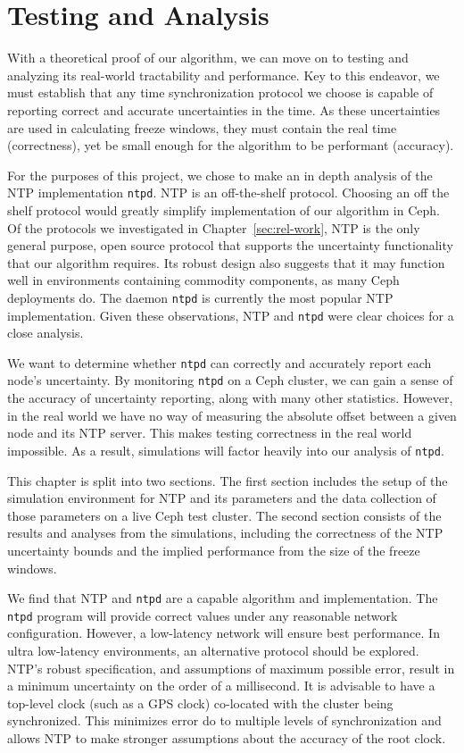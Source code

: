 \chapter{Testing and Analysis}
\label{sec:results}

With a theoretical proof of our algorithm, we can move on to
testing and analyzing its real-world tractability and performance. 
Key to this endeavor, we must establish that any time synchronization
protocol we choose is capable of reporting correct and accurate uncertainties
in the time. As these uncertainties are used in calculating freeze windows,
they must contain the real time (correctness), yet be small enough for the algorithm to 
be performant (accuracy). 

For the purposes of this project, we chose to make an in depth analysis of 
the NTP implementation \texttt{ntpd}. NTP is an off-the-shelf protocol. Choosing
an off the shelf protocol would greatly simplify implementation of our 
algorithm in Ceph. Of the protocols we investigated in Chapter~\ref{sec:rel-work}, 
NTP is the only general purpose, open source protocol that supports the 
uncertainty functionality that our algorithm requires. Its robust design
also suggests that it may function well in environments containing commodity 
components, as many Ceph deployments do. The daemon \texttt{ntpd} 
is currently the most popular NTP implementation. Given these observations, 
NTP and \texttt{ntpd} were clear choices for a close analysis.

We want to determine whether \texttt{ntpd} can 
correctly and accurately report each node's uncertainty. By monitoring 
\texttt{ntpd} on a Ceph cluster, we can gain a sense of the accuracy of
uncertainty reporting, along with many other statistics. However,
in the real world we have no way of measuring the absolute offset between
a given node and its NTP server. This makes testing correctness in the 
real world impossible. As a result, simulations will factor heavily into 
our analysis of \texttt{ntpd}.

This chapter is split into two sections. The first section includes
the setup of the simulation environment for NTP and its parameters
and the data collection of those parameters on a live Ceph test cluster.
The second section consists of the results and analyses from the simulations,
including the correctness of the NTP uncertainty bounds and the implied
performance from the size of the freeze windows. 

We find that NTP and \texttt{ntpd} are a capable algorithm and implementation.
The \texttt{ntpd} program will provide correct values under any reasonable 
network configuration. However, a low-latency network will ensure best 
performance. In ultra low-latency environments, an alternative protocol 
should be explored. NTP's robust specification, and assumptions of maximum possible
error, result in a minimum uncertainty on the order of a millisecond. 
It is advisable to have a top-level clock (such as a GPS clock)
co-located with the cluster being synchronized. This minimizes error do to
multiple levels of synchronization and allows NTP to make stronger assumptions
about the accuracy of the root clock. 



